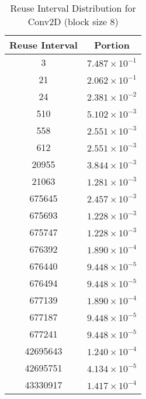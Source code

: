\documentclass[conference]{article}
\begin{document}
\begin{table}[H]
\centering
\begin{tabular}{|c|c|}
    \hline
    Reuse Interval & Portion \\ 
    \hline
    3 & $7.487 \times 10^{-1}$ \\ 
    21 & $2.062 \times 10^{-1}$ \\ 
    24 & $2.381 \times 10^{-2}$ \\ 
    510 & $5.102 \times 10^{-3}$ \\ 
    558 & $2.551 \times 10^{-3}$ \\ 
    612 & $2.551 \times 10^{-3}$ \\ 
    20955 & $3.844 \times 10^{-3}$ \\ 
    21063 & $1.281 \times 10^{-3}$ \\ 
    675645 & $2.457 \times 10^{-3}$ \\ 
    675693 & $1.228 \times 10^{-3}$ \\ 
    675747 & $1.228 \times 10^{-3}$ \\ 
    676392 & $1.890 \times 10^{-4}$ \\ 
    676440 & $9.448 \times 10^{-5}$ \\ 
    676494 & $9.448 \times 10^{-5}$ \\ 
    677139 & $1.890 \times 10^{-4}$ \\ 
    677187 & $9.448 \times 10^{-5}$ \\ 
    677241 & $9.448 \times 10^{-5}$ \\ 
    42695643 & $1.240 \times 10^{-4}$ \\ 
    42695751 & $4.134 \times 10^{-5}$ \\ 
    43330917 & $1.417 \times 10^{-4}$ \\ 
    \hline
\end{tabular}
\caption{Reuse Interval Distribution for Conv2D (block size 8)}
\end{table}
\end{document}
